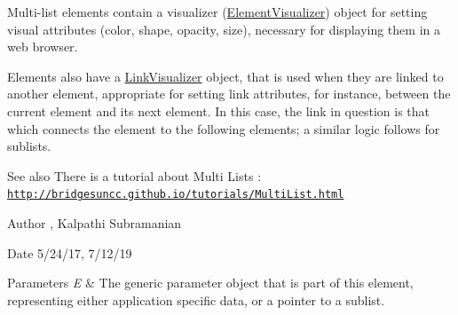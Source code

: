 Multi-\/list elements contain a visualizer (\hyperlink{classbridges_1_1datastructure_1_1_element_visualizer}{Element\+Visualizer}) object for setting visual attributes (color, shape, opacity, size), necessary for displaying them in a web browser.

Elements also have a \hyperlink{classbridges_1_1datastructure_1_1_link_visualizer}{Link\+Visualizer} object, that is used when they are linked to another element, appropriate for setting link attributes, for instance, between the current element and its next element. In this case, the link in question is that which connects the element to the following elements; a similar logic follows for sublists.

\begin{DoxySeeAlso}{See also}
There is a tutorial about Multi Lists \+: \href{http://bridgesuncc.github.io/tutorials/MultiList.html}{\tt http\+://bridgesuncc.\+github.\+io/tutorials/\+Multi\+List.\+html}
\end{DoxySeeAlso}
\begin{DoxyAuthor}{Author}
, Kalpathi Subramanian
\end{DoxyAuthor}
\begin{DoxyDate}{Date}
5/24/17, 7/12/19
\end{DoxyDate}

\begin{DoxyParams}{Parameters}
{\em E} & The generic parameter object that is part of this element, representing either application specific data, or a pointer to a sublist. \\
\hline
\end{DoxyParams}
